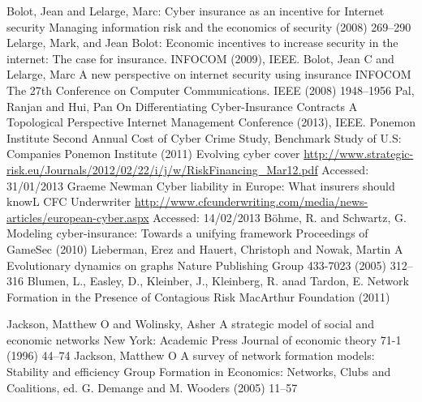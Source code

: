 \documentclass{llncs}
\begin{document}

%
\begin{thebibliography}{[MT1]}
%
  Bolot, Jean and Lelarge, Marc:
  Cyber insurance as an incentive for Internet security
  Managing information risk and the economics of security
  (2008) 269--290
%
	Lelarge, Mark, and Jean Bolot:
	Economic incentives to increase security in the internet: The case for insurance.
	INFOCOM (2009), IEEE.
%
	Bolot, Jean C and Lelarge, Marc
 	A new perspective on internet security using insurance
 	INFOCOM The 27th Conference on Computer Communications. IEEE
 	(2008) 1948--1956
	Pal, Ranjan and Hui, Pan	
	On Differentiating Cyber-Insurance Contracts A Topological Perspective
  	Internet Management Conference (2013), IEEE.
%
Ponemon Institute
Second Annual Cost of Cyber Crime Study, Benchmark Study of U.S: Companies
Ponemon Institute (2011)
%
  Evolving cyber cover
  \url{http://www.strategic-risk.eu/Journals/2012/02/22/i/j/w/RiskFinancing_Mar12.pdf}
  Accessed: 31/01/2013
	Graeme Newman
	Cyber liability in Europe: What insurers should knowL
	CFC Underwriter \url{http://www.cfcunderwriting.com/media/news-articles/european-cyber.aspx}
 	Accessed: 14/02/2013
  B{\"o}hme, R. and Schwartz, G.
  Modeling cyber-insurance: Towards a unifying framework
  Proceedings of GameSec (2010)
%
Lieberman, Erez and Hauert, Christoph and Nowak, Martin A
 Evolutionary dynamics on graphs
Nature Publishing Group 433-7023 (2005) 312--316
%
Blumen, L., Easley, D., Kleinber, J.,  Kleinberg, R. anad Tardon, E.
Network Formation in the Presence of Contagious Risk
MacArthur Foundation (2011)
 
 Jackson, Matthew O and Wolinsky, Asher
 A strategic model of social and economic networks
 New York: Academic Press Journal of economic theory 71-1 (1996) 44--74
%
Jackson, Matthew O
A survey of network formation models: Stability and efficiency
Group Formation in Economics: Networks, Clubs and Coalitions, ed. G. Demange and M. Wooders (2005) 11--57 


\end{thebibliography}
%
\end{document}
